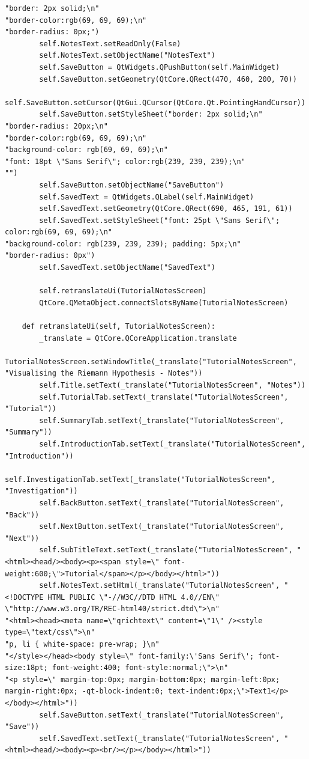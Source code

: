 \documentclass{article}
\begin{document}
\begin{lstlisting}
"border: 2px solid;\n"
"border-color:rgb(69, 69, 69);\n"
"border-radius: 0px;")
        self.NotesText.setReadOnly(False)
        self.NotesText.setObjectName("NotesText")
        self.SaveButton = QtWidgets.QPushButton(self.MainWidget)
        self.SaveButton.setGeometry(QtCore.QRect(470, 460, 200, 70))
        self.SaveButton.setCursor(QtGui.QCursor(QtCore.Qt.PointingHandCursor))
        self.SaveButton.setStyleSheet("border: 2px solid;\n"
"border-radius: 20px;\n"
"border-color:rgb(69, 69, 69);\n"
"background-color: rgb(69, 69, 69);\n"
"font: 18pt \"Sans Serif\"; color:rgb(239, 239, 239);\n"
"")
        self.SaveButton.setObjectName("SaveButton")
        self.SavedText = QtWidgets.QLabel(self.MainWidget)
        self.SavedText.setGeometry(QtCore.QRect(690, 465, 191, 61))
        self.SavedText.setStyleSheet("font: 25pt \"Sans Serif\"; color:rgb(69, 69, 69);\n"
"background-color: rgb(239, 239, 239); padding: 5px;\n"
"border-radius: 0px")
        self.SavedText.setObjectName("SavedText")

        self.retranslateUi(TutorialNotesScreen)
        QtCore.QMetaObject.connectSlotsByName(TutorialNotesScreen)

    def retranslateUi(self, TutorialNotesScreen):
        _translate = QtCore.QCoreApplication.translate
        TutorialNotesScreen.setWindowTitle(_translate("TutorialNotesScreen", "Visualising the Riemann Hypothesis - Notes"))
        self.Title.setText(_translate("TutorialNotesScreen", "Notes"))
        self.TutorialTab.setText(_translate("TutorialNotesScreen", "Tutorial"))
        self.SummaryTab.setText(_translate("TutorialNotesScreen", "Summary"))
        self.IntroductionTab.setText(_translate("TutorialNotesScreen", "Introduction"))
        self.InvestigationTab.setText(_translate("TutorialNotesScreen", "Investigation"))
        self.BackButton.setText(_translate("TutorialNotesScreen", "Back"))
        self.NextButton.setText(_translate("TutorialNotesScreen", "Next"))
        self.SubTitleText.setText(_translate("TutorialNotesScreen", "<html><head/><body><p><span style=\" font-weight:600;\">Tutorial</span></p></body></html>"))
        self.NotesText.setHtml(_translate("TutorialNotesScreen", "<!DOCTYPE HTML PUBLIC \"-//W3C//DTD HTML 4.0//EN\" \"http://www.w3.org/TR/REC-html40/strict.dtd\">\n"
"<html><head><meta name=\"qrichtext\" content=\"1\" /><style type=\"text/css\">\n"
"p, li { white-space: pre-wrap; }\n"
"</style></head><body style=\" font-family:\'Sans Serif\'; font-size:18pt; font-weight:400; font-style:normal;\">\n"
"<p style=\" margin-top:0px; margin-bottom:0px; margin-left:0px; margin-right:0px; -qt-block-indent:0; text-indent:0px;\">Text1</p></body></html>"))
        self.SaveButton.setText(_translate("TutorialNotesScreen", "Save"))
        self.SavedText.setText(_translate("TutorialNotesScreen", "<html><head/><body><p><br/></p></body></html>"))
\end{lstlisting}
\end{document}
